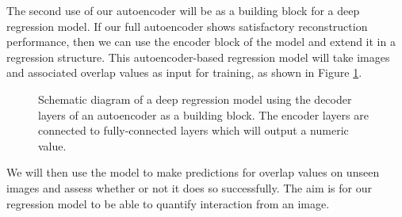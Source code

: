 The second use of our autoencoder will be as a building block for a deep regression model. If our full autoencoder shows satisfactory reconstruction performance, then we can use the encoder block of the model and extend it in a regression structure. This autoencoder-based regression model will take images and associated overlap values as input for training, as shown in Figure \ref{fig:regression}.

\begin{figure}[h]
    \centering
    \caption{Schematic diagram of a deep regression model using the decoder layers of an autoencoder as a building block. The encoder layers are connected to fully-connected layers which will output a numeric value.}
    \label{fig:regression}
\end{figure}

We will then use the model to make predictions for overlap values on unseen images and assess whether or not it does so successfully. The aim is for our regression model to be able to quantify interaction from an image.
